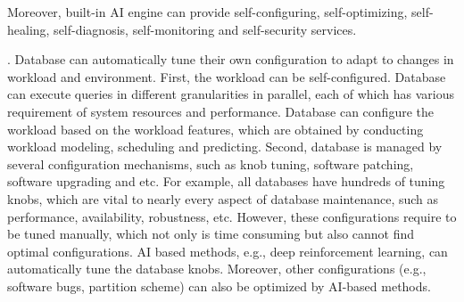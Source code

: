 
Moreover, built-in AI engine can provide self-configuring, self-optimizing, self-healing, self-diagnosis, self-monitoring and self-security services. 

. Database can automatically tune their own configuration to adapt to changes in workload and environment. First, the workload can be self-configured. Database can execute queries in different granularities in parallel, each of which has various requirement of system resources and performance. Database can configure the workload based on the workload features, which are obtained by conducting workload modeling, scheduling and predicting.  Second, database is managed by several configuration mechanisms, such as knob tuning, software patching, software upgrading and etc. For example, all databases have hundreds of tuning knobs, which are vital to nearly every aspect of database maintenance, such as performance, availability, robustness, etc. However, these configurations require to be tuned manually, which not only is time consuming but also cannot find optimal configurations. AI based methods, e.g., deep reinforcement learning, can automatically tune the database knobs. Moreover, other configurations (e.g., software bugs, partition scheme) can also be optimized by AI-based methods. 



